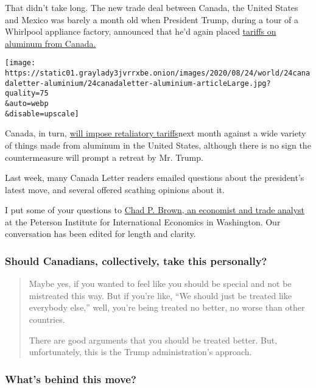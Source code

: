 That didn't take long. The new trade deal between Canada, the United
States and Mexico was barely a month old when President Trump, during a
tour of a Whirlpool appliance factory, announced that he'd again placed
\href{https://www.nytimes3xbfgragh.onion/2020/08/06/business/economy/trump-canadian-aluminum-tariffs.html}{tariffs
on aluminum from Canada.}

\texttt{[image: https://static01.graylady3jvrrxbe.onion/images/2020/08/24/world/24canadaletter-aluminium/24canadaletter-aluminium-articleLarge.jpg?quality=75\\\&auto=webp\\\&disable=upscale]}

Canada, in turn,
\href{https://www.canada.ca/en/department-finance/programs/consultations/2020/notice-intent-impose-countermeasures-action-against-united-states-response-tariffs-canadian-aluminum-products.html}{will
impose retaliatory tariffs}next month against a wide variety of things
made from aluminum in the United States, although there is no sign the
countermeasure will prompt a retreat by Mr. Trump.

Last week, many Canada Letter readers emailed questions about the
president's latest move, and several offered scathing opinions about it.

I put some of your questions to \href{https://www.chadpbown.com}{Chad P.
Brown, an economist and trade analyst} at the Peterson Institute for
International Economics in Washington. Our conversation has been edited
for length and clarity.

\hypertarget{should-canadians-collectively-take-this-personally}{%
\subsubsection{Should Canadians, collectively, take this
personally?}\label{should-canadians-collectively-take-this-personally}}

\begin{quote}
Maybe yes, if you wanted to feel like you should be special and not be
mistreated this way. But if you're like, ``We should just be treated
like everybody else,'' well, you're being treated no better, no worse
than other countries.

There are good arguments that you should be treated better. But,
unfortunately, this is the Trump administration's approach.
\end{quote}

\hypertarget{whats-behind-this-move}{%
\subsubsection{What's behind this move?}\label{whats-behind-this-move}}

